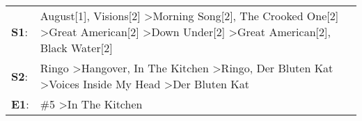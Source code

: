 \begin{supertabular}{p{0.03\textwidth}p{0.92\textwidth}}
 \textbf{S1}:  &  August[1]\textsuperscript{}, \enspace Visions[2]\textsuperscript{} \textgreater \enspace Morning Song[2]\textsuperscript{}, \enspace The Crooked One[2]\textsuperscript{} \textgreater \enspace Great American[2]\textsuperscript{} \textgreater \enspace Down Under[2]\textsuperscript{} \textgreater \enspace Great American[2]\textsuperscript{}, \enspace Black Water[2]\textsuperscript{}  \enspace  \\
 \textbf{S2}:  &                                                               Ringo\textsuperscript{} \textgreater \enspace Hangover\textsuperscript{}, \enspace In The Kitchen\textsuperscript{} \textgreater \enspace Ringo\textsuperscript{}, \enspace Der Bluten Kat\textsuperscript{} \textgreater \enspace Voices Inside My Head\textsuperscript{} \textgreater \enspace Der Bluten Kat\textsuperscript{}  \enspace  \\
 \textbf{E1}:  &                                                                                                                                                                                                                                                                                                                    \#5\textsuperscript{} \textgreater \enspace In The Kitchen\textsuperscript{}  \enspace  \\
\end{supertabular}
